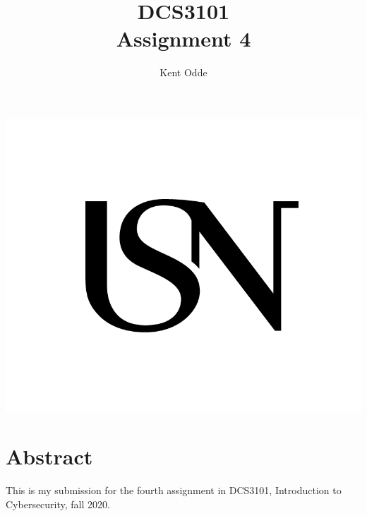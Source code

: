 \documentclass{article}
\begin{document}
\author{Kent Odde}
\title{DCS3101\\Assignment 4}

\maketitle
\thispagestyle{empty}
\begin{center}
\includegraphics[width=\linewidth,height=0.2\textheight,keepaspectratio]{img/USN.png}
\end{center}
\newpage

\tableofcontents

\newpage

\section{Abstract}
This is my submission for the fourth assignment in DCS3101, Introduction to Cybersecurity, fall 2020.
\end{document}
